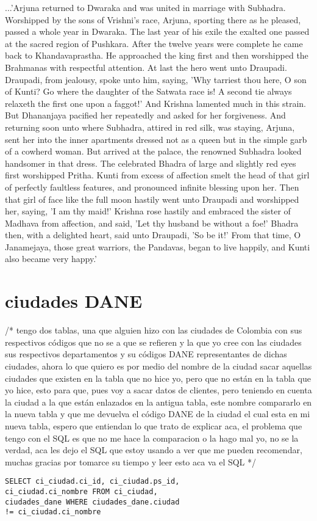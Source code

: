 \documentclass[a1paper]{article}
\begin{document}
\begin{multicols}{7}
{...'Arjuna returned to Dwaraka and was united in marriage
with Subhadra. Worshipped by the sons of Vrishni's race, Arjuna, sporting
there as he pleased, passed a whole year in Dwaraka. The last year of his
exile the exalted one passed at the sacred region of Pushkara. After the
twelve years were complete he came back to Khandavaprastha. He approached
the king first and then worshipped the Brahmanas with respectful
attention. At last the hero went unto Draupadi. Draupadi, from jealousy,
spoke unto him, saying, 'Why tarriest thou here, O son of Kunti? Go where
the daughter of the Satwata race is! A second tie always relaxeth the
first one upon a faggot!' And Krishna lamented much in this strain. But
Dhananjaya pacified her repeatedly and asked for her forgiveness. And
returning soon unto where Subhadra, attired in red silk, was staying,
Arjuna, sent her into the inner apartments dressed not as a queen but in
the simple garb of a cowherd woman. But arrived at the palace, the
renowned Subhadra looked handsomer in that dress. The celebrated Bhadra
of large and slightly red eyes first worshipped Pritha. Kunti from excess
of affection smelt the head of that girl of perfectly faultless features,
and pronounced infinite blessing upon her. Then that girl of face like
the full moon hastily went unto Draupadi and worshipped her, saying, 'I
am thy maid!' Krishna rose hastily and embraced the sister of Madhava
from affection, and said, 'Let thy husband be without a foe!' Bhadra
then, with a delighted heart, said unto Draupadi, 'So be it!' From that
time, O Janamejaya, those great warriors, the Pandavas, began to live
happily, and Kunti also became very happy.'





\section{ciudades DANE}

/*
tengo dos tablas, una que alguien hizo con las ciudades de Colombia con sus respectivos códigos que no se a que se refieren y la que yo cree con las ciudades sus respectivos departamentos y su códigos DANE representantes de dichas ciudades, ahora lo que quiero es por medio del nombre de la ciudad sacar aquellas ciudades que existen en la tabla que no hice yo, pero que no están en la tabla que yo hice, esto para que, pues voy a sacar datos de clientes, pero teniendo en cuenta la ciudad a la que están enlazados en la antigua tabla, este nombre compararlo en la nueva tabla y que me devuelva el código DANE de la ciudad el cual esta en mi nueva tabla, espero que entiendan lo que trato de explicar aca, el problema que tengo con el SQL es que no me hace la comparacion o la hago mal yo, no se la verdad, aca les dejo el SQL que estoy usando a ver que me pueden recomendar, muchas gracias por tomarce su tiempo y leer esto aca va el SQL 
*/
\begin{verbatim}
SELECT ci_ciudad.ci_id, ci_ciudad.ps_id, 
ci_ciudad.ci_nombre FROM ci_ciudad, 
ciudades_dane WHERE ciudades_dane.ciudad
!= ci_ciudad.ci_nombre
\end{verbatim}

}
\end{multicols}
\end{document}
